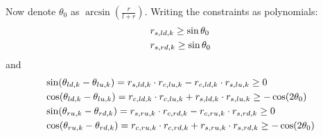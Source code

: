 Now denote $\theta_0$ as $\arcsin(\frac{r}{l+r})$. Writing the constraints as polynomials:
\begin{align}
    & \rs[ld,k] \ge \sin\theta_0 \\
    & \rs[rd,k] \ge \sin\theta_0
\end{align}
and 
\begin{align}
    & \sin(\theta_{ld,k} - \theta_{lu,k}) 
    = \rs[ld,k] \cdot \rc[lu,k] - \rc[ld,k] \cdot \rs[lu,k] \ge 0 \\
    & \cos(\theta_{ld,k} - \theta_{lu,k}) 
    = \rc[ld,k] \cdot \rc[lu,k] + \rs[ld,k] \cdot \rs[lu,k] \ge -\cos(2\theta_0) \\
    & \sin(\theta_{ru,k} - \theta_{rd,k}) 
    = \rs[ru,k] \cdot \rc[rd,k] - \rc[ru,k] \cdot \rs[rd,k] \ge 0 \\
    & \cos(\theta_{ru,k} - \theta_{rd,k}) 
    = \rc[ru,k] \cdot \rc[rd,k] + \rs[ru,k] \cdot \rs[rd,k] \ge -\cos(2\theta_0)
\end{align}

